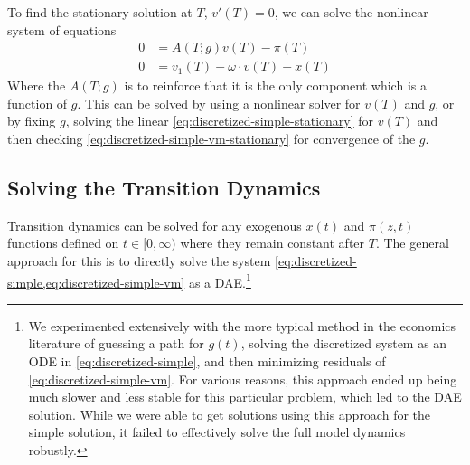 \documentclass[11pt]{article}
\begin{document}
\noindent To find the stationary solution at $T$,  $v'(T) = 0$, we can solve the nonlinear system of equations
\begin{align}
	0 &= A(T; g) v(T) - \pi(T)\label{eq:discretized-simple-stationary}\\
	0 &= v_1(T) - \omega \cdot v(T) + x(T)\label{eq:discretized-simple-vm-stationary}
\end{align}
Where the $ A(T; g)$ is to reinforce that it is the only component which is a function of $g$.  This can be solved by using a nonlinear solver for $v(T)$ and $g$, or by fixing $g$, solving the linear \cref{eq:discretized-simple-stationary} for $v(T)$ and then checking \cref{eq:discretized-simple-vm-stationary} for convergence of the $g$.

\subsection{Solving the Transition Dynamics}

Transition dynamics can be solved for any exogenous $x(t)$ and $\pi(z,t)$ functions defined on $t \in [0,\infty)$ where they remain constant after $T$.  The general approach  for this is to directly solve the system \cref{eq:discretized-simple,eq:discretized-simple-vm} as a DAE.\footnote{ We experimented extensively with the more typical method in the economics literature of guessing a path for $g(t)$, solving the discretized system as an ODE in \cref{eq:discretized-simple}, and then minimizing residuals of \cref{eq:discretized-simple-vm}.  For various reasons, this approach ended up being much slower and less stable for this particular problem, which led to the DAE solution.  While we were able to get solutions using this approach for the simple solution, it failed to effectively solve the full model dynamics robustly.}
\end{document}
